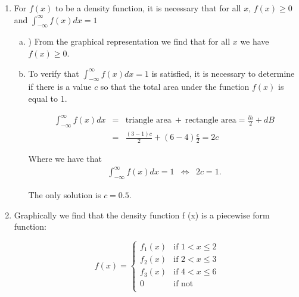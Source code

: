 \documentclass[12pt,thmsa]{article}
\begin{document}
\begin{enumerate}%
  
  
\item For $f(x)$ to be a density function, it is necessary that for all
$x$, $f(x) \ge 0$ and $\int_{-\infty}^{\infty}f(x)dx = 1$
  
  \begin{enumerate}[(a)]
  \item ) From the graphical representation we find that for all $x$ we have $f(x) \ge 0$. %
  \item To verify that $\int_{-\infty}^{\infty}f(x)dx = 1$  is satisfied, it is necessary to determine if there is a value $c$ so that the total area under the function $f(x)$ is equal to 1.
  
    
    \begin{eqnarray*}
      \int_{-\infty}^{\infty}f(x)dx  &=& \left. \text{triangle area} \ + \ \text{rectangle area} = \frac{lh}{2} + dB \right. \nonumber \\
       &=& \left. \frac{(3-1)c}{2} + (6-4)\frac{c}{2} = 2c \right. \nonumber
       \end{eqnarray*}
    
    Where we have that
       \begin{eqnarray*}
      \int_{-\infty}^{\infty}f(x)dx =1  &\iff& 2c =1.
    \end{eqnarray*}
    
    The only solution is $c = 0.5$.
    
  \end{enumerate}
  
  
\item Graphically we find that the density function f (x) is a piecewise form function:
  
  \begin{equation*}
    f(x) = \left\{ 
      \begin{array}{ll}
        f_1(x) &\text{if } 1 < x \le 2 \\
        f_2(x) &\text{if } 2 < x \le 3 \\
        f_3(x) &\text{if } 4 < x \le 6 \\
        0  & \text{if not} \\
      \end{array}
    \right.
  \end{equation*}
  

\end{enumerate}
\end{document}
